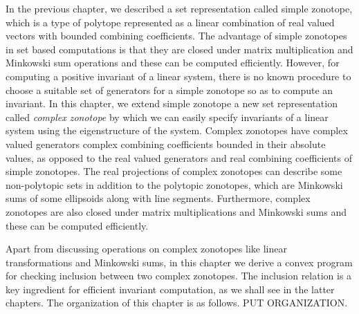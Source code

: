 In the previous chapter, we described a set representation called
simple zonotope, which is a type of polytope represented as a linear
combination of real valued vectors with bounded combining
coefficients.  The advantage of simple zonotopes in set based
computations is that they are closed under matrix multiplication and
Minkowski sum operations and these can be computed efficiently.
However, for computing a positive invariant of a linear system, there
is no known procedure to choose a suitable set of generators for a
simple zonotope so as to compute an invariant.  In this chapter, we
extend simple zonotope a new set representation called \emph{complex
zonotope} by which we can easily specify invariants of a linear system
using the eigenstructure of the system.  Complex zonotopes have
complex valued generators complex combining coefficients bounded in
their absolute values, as opposed to the real valued generators and
real combining coefficients of simple zonotopes.  The real projections
of complex zonotopes can describe some non-polytopic sets in addition
to the polytopic zonotopes, which are Minkowski sums of some
ellipsoids along with line segments.  Furthermore, complex zonotopes
are also closed under matrix multiplications and Minkowski sums and
these can be computed efficiently.

Apart from discussing operations on complex zonotopes like linear
transformations and Minkowski sums, in this chapter we derive a convex
program for checking inclusion between two complex zonotopes.  The
inclusion relation is a key ingredient for efficient invariant
computation, as we shall see in the latter chapters.  The organization
of this chapter is as follows.  PUT ORGANIZATION.

